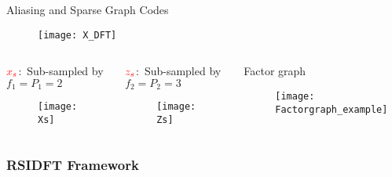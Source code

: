 	\begin{frame}{Aliasing and Sparse Graph Codes}
		
		\begin{block}{}
			\begin{figure}[t]
				\centering
				\texttt{[image: X\_DFT]}
			\end{figure}
		\end{block}
		
		\begin{columns}
			
			\column{.47\textwidth}
			\begin{block}{{\small $\color{red}x_s$:\ Sub-sampled by $f_1=P_1=2$}}
				\begin{figure}[t]
					\centering
					\texttt{[image: Xs]}
				\end{figure}
			\end{block}
			
			\begin{block}{{\small$\color{red}z_s$:\ Sub-sampled by $f_2=P_2=3$}}
				\begin{figure}[t]
					\centering
					\texttt{[image: Zs]}
				\end{figure}
			\end{block}
			
			\begin{block}{\small Factor graph}
				\begin{figure}[t]
					\centering
					\texttt{[image: Factorgraph\_example]}
				\end{figure}
			\end{block}
		\end{columns}
	\end{frame}

\begin{frame}\frametitle{RSIDFT Framework}
	
		\begin{figure}[t!]
			\begin{center}
				\resizebox{0.8\textwidth}{!}{}
			\end{center}	   
			\label{fig:rsidft}
			\vspace{5 pt}
		\end{figure}
\end{frame}



